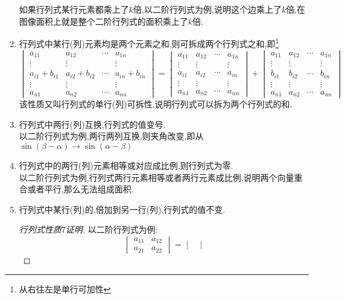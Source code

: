 \documentclass[8pt a4paper, oneside, UTF8]{ctexbook}
\begin{document}
\begin{sloppypar}
\begin{enumerate}
              如果行列式某行元素都乘上了$k$倍,以二阶行列式为例,说明这个边乘上了$k$倍,在图像面积上就是整个二阶行列式的面积乘上了$k$倍.
        \item 行列式中某行(列)元素均是两个元素之和,则可拆成两个行列式之和,即\footnote{从右往左是单行可加性}
              $$\begin{vmatrix}a_{11}&a_{12}&\cdots&a_{1n}\\\vdots&\vdots&&\vdots\\a_{i1}+b_{i1}&a_{i2}+b_{i2}&\cdots&a_{in}+b_{in}\\\vdots&\vdots&&\vdots\\a_{n1}&a_{n2}&\cdots&a_{nn}\end{vmatrix}=\begin{vmatrix}a_{11}&a_{12}&\cdots&a_{1n}\\\vdots&\vdots&&\vdots\\a_{i1}&a_{i2}&\cdots&a_{in}\\\vdots&\vdots&&\vdots\\a_{n1}&a_{n2}&\cdots&a_{nn}\end{vmatrix}+\begin{vmatrix}a_{11}&a_{12}&\cdots&a_{1n}\\\vdots&\vdots&&\vdots\\b_{i1}&b_{i2}&\cdots&b_{in}\\\vdots&\vdots&&\vdots\\a_{n1}&a_{n2}&\cdots&a_{nn}\end{vmatrix}$$
              该性质又叫行列式的单行(列)可拆性,说明行列式可以拆为两个行列式的和.
        \item 行列式中两行(列)互换,行列式的值变号.\\
              以二阶行列式为例,两行两列互换,则夹角改变,即从$\sin(\beta-\alpha) \rightarrow \sin(\alpha-\beta)$
        \item 行列式中的两行(列)元素相等或对应成比例,则行列式为零.\\
              以二阶行列式为例,行列式两行元素相等或者两行元素成比例,说明两个向量重合或者平行,那么无法组成面积.
        \item 行列式中某行(列)的,倍加到另一行(列),行列式的值不变.
              \begin{proof}[行列式性质$7$证明]
                  以二阶行列式为例:
                  $$
                      \begin{vmatrix}
                          a_{11} & a_{12} \\
                          a_{21} & a_{22}
                      \end{vmatrix}=\begin{vmatrix}

\end{vmatrix}$$
\end{proof}
\end{enumerate}
\end{sloppypar}
\end{document}
